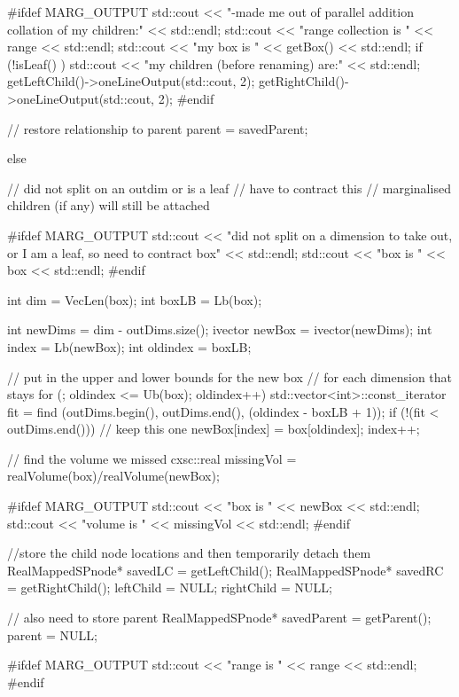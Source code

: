 \begin{DoxyCode}
{{    #ifdef MARG_OUTPUT
      std::cout << "\tre-made me out of parallel addition collation of my
       children:" 
                  << std::endl;
      std::cout << "\tmy range collection is " << range << std::endl;
      std::cout << "\tand my box is " << getBox() << std::endl;
      if (!isLeaf() ) {
        std::cout << "\tand my children (before renaming) are:" << std::endl;
        getLeftChild()->oneLineOutput(std::cout, 2);
        getRightChild()->oneLineOutput(std::cout, 2);
      }
    #endif
    
    // restore relationship to parent
    parent = savedParent;
    
  }
  else { // did not split on an outdim or is a leaf
    // have to contract this
    // marginalised children (if any) will still be attached
    
    #ifdef MARG_OUTPUT
      std::cout << "\tI did not split on a dimension to take out, or I am a
       leaf, so need to contract box" << std::endl;
      std::cout << "\tmy box is " << box << std::endl;
    #endif
    
    int dim = VecLen(box);
    int boxLB = Lb(box);
  
    int newDims = dim - outDims.size();
    ivector newBox = ivector(newDims); 
    int index = Lb(newBox);
    int oldindex = boxLB;
  
    // put in the upper and lower bounds for the new box
    // for each dimension that stays  
    for (; oldindex <= Ub(box); oldindex++) {
      std::vector<int>::const_iterator fit 
      = find (outDims.begin(), outDims.end(), (oldindex - boxLB + 1));
      if (!(fit < outDims.end())) { // keep this one
        newBox[index] = box[oldindex];
        index++;
      }
    }
    
    // find the volume we missed
    cxsc::real missingVol = realVolume(box)/realVolume(newBox);
    
    #ifdef MARG_OUTPUT
      std::cout << "\tnew box is " << newBox << std::endl;
      std::cout << "\tmissing volume is " << missingVol << std::endl;
    #endif
    
    //store the child node locations and then temporarily detach them
    RealMappedSPnode* savedLC = getLeftChild();
    RealMappedSPnode* savedRC = getRightChild();
    leftChild = NULL;
    rightChild = NULL;
    
    // also need to store parent
    RealMappedSPnode* savedParent = getParent();
    parent = NULL;
    
    #ifdef MARG_OUTPUT
      std::cout << "\tcurrent range is " << range << std::endl;
    #endif
  
}}
\end{DoxyCode}
